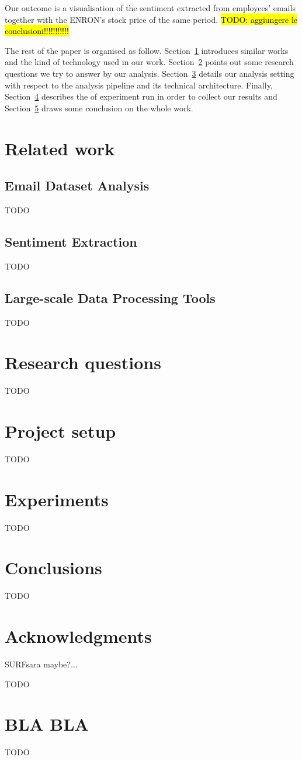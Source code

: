\documentclass{vldb}
\newcommand{\hlc}[2][lightcyan]{{\sethlcolor{#1}\hl{#2}}}
\begin{document}
Our outcome is a visualisation of the sentiment extracted from employees' emails together with the ENRON's stock price of the same period.
\hlc{TODO: aggiungere le conclusioni!!!!!!!!!!!}

The rest of the paper is organised as follow.
Section~\ref{sec:r-w} introduces similar works and the kind of technology used in our work.
Section~\ref{sec:r-q} points out some research questions we try to answer by our analysis.
Section~\ref{sec:p-s} details our analysis setting with respect to the analysis pipeline and its technical architecture. 
Finally, Section~\ref{sec:exp} describes the of experiment run in order to collect our results and Section~\ref{sec:concl} draws some conclusion on the whole work.



\section{Related work}
\label{sec:r-w}

\subsection{Email Dataset Analysis}
TODO

\subsection{Sentiment Extraction}
TODO

\subsection{Large-scale Data Processing Tools}
TODO


\section{Research questions}
\label{sec:r-q}
TODO

\section{Project setup}
\label{sec:p-s}
TODO

\section{Experiments}
\label{sec:exp}
TODO

\section{Conclusions}
\label{sec:concl}
TODO

\section{Acknowledgments}
SURFsara maybe?...

\clearpage
\balance

 

\begin{appendix}
TODO

\section{BLA BLA}
TODO

\end{appendix}
\end{document}
